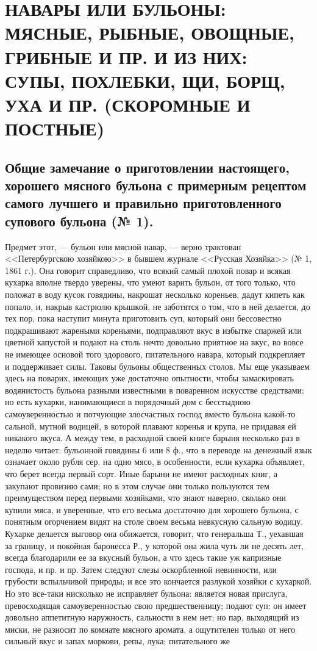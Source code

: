 \section{НАВАРЫ ИЛИ БУЛЬОНЫ: МЯСНЫЕ, РЫБНЫЕ, ОВОЩНЫЕ, ГРИБНЫЕ И ПР. И ИЗ НИХ: СУПЫ, ПОХЛЕБКИ, ЩИ, БОРЩ, УХА И ПР. (СКОРОМНЫЕ И ПОСТНЫЕ)} %

\subsection*{Общие замечание о приготовлении настоящего, хорошего мясного бульона с примерным рецептом самого лучшего и правильно приготовленного супового бульона (№ 1).}

Предмет этот, — бульон или мясной навар, — верно трактован <<Петербургскою хозяйкою>> в бывшем журнале <<Русская Хозяйка>> (№ 1, 1861 г.). Она говорит справедливо, что всякий самый плохой повар и всякая кухарка вполне твердо уверены, что умеют варить бульон, от того только, что положат в воду кусок говядины, накрошат несколько кореньев, дадут кипеть как попало, и, накрыв кастрюлю крышкой, не заботятся о том, что в ней делается, до тех пор, пока наступит минута приготовить суп, который они бессовестно подкрашивают жареными кореньями, подправляют вкус в избытке спаржей или цветной капустой и подают на столь нечто довольно приятное на вкус, во вовсе не имеющее основой того здорового, питательного навара, который подкрепляет и поддерживает силы. Таковы бульоны общественных столов. Мы еще указываем здесь на поварих, имеющих уже достаточно опытности, чтобы замаскировать водянистость бульона разными известными в поваренном искусстве средствами; но есть кухарки, нанимающиеся в порядочный дом с бесстыдною самоуверенностью и потчующие злосчастных господ вместо бульона какой-то сальной, мутной водицей, в которой плавают коренья и крупа, не придавая ей никакого вкуса. А между тем, в расходной своей книге барыня несколько раз в неделю читает: бульонной говядины 6 или 8 ф., что в переводе на денежный язык означает около рубля сер. на одно мясо, в особенности, если кухарка объявляет, что берет всегда первый сорт. Иные барыни не имеют расходных книг, а закупают провизию сами; но в этом случае они только пользуются тем преимуществом перед первыми хозяйками, что знают наверно, сколько они купили мяса, и уверенные, что его весьма достаточно для хорошего бульона, с понятным огорчением видят на столе своем весьма невкусную сальную водицу. Кухарке делается выговор она обижается, говорит, что генеральша Т., уехавшая за границу, и покойная баронесса Р., у которой она жила чуть ли не десять лет, всегда благодарили ее за вкусный бульон, а что здесь такие уж капризные господа, и пр. и пр. Затем следуют слезы оскорбленной невинности, или грубости вспыльчивой природы; и все это кончается разлукой хозяйки с кухаркой. Но это все-таки нисколько не исправляет бульона: является новая прислуга, превосходящая самоуверенностью свою предшественницу; подают суп: он имеет довольно аппетитную наружность, сальности в нем нет; но пар, выходящий из миски, не разносит по комнате мясного аромата, а ощутителен только от него сильный вкус и запах моркови, репы, лука; питательного же 
